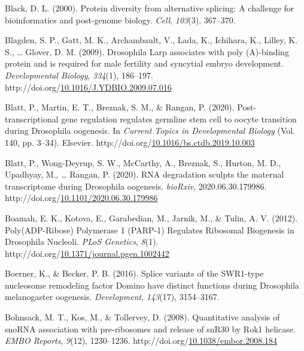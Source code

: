\documentclass[12pt,oneside]{reedthesis}
\newlength{\cslhangindent}
\newenvironment{CSLReferences}[2] %
 {%
  \setlength{\parindent}{0pt}
  \ifodd #1 \everypar{\setlength{\hangindent}{\cslhangindent}}\ignorespaces\fi
  \ifnum #2 > 0
  \setlength{\parskip}{#2\baselineskip}
  \fi
 }%
 {}
\begin{document}
\begin{CSLReferences}{1}{0}
\leavevmode{}%
Black, D. L. (2000). Protein diversity from alternative splicing: A challenge for bioinformatics and post-genome biology. \emph{Cell}, \emph{103}(3), 367--370.

\leavevmode{}%
Blagden, S. P., Gatt, M. K., Archambault, V., Lada, K., Ichihara, K., Lilley, K. S., \ldots{} Glover, D. M. (2009). Drosophila {Larp} associates with poly ({A})-binding protein and is required for male fertility and syncytial embryo development. \emph{Developmental Biology}, \emph{334}(1), 186--197. http://doi.org/\href{https://doi.org/10.1016/J.YDBIO.2009.07.016}{10.1016/J.YDBIO.2009.07.016}

\leavevmode{}%
Blatt, P., Martin, E. T., Breznak, S. M., \& Rangan, P. (2020). Post-transcriptional gene regulation regulates germline stem cell to oocyte transition during {Drosophila} oogenesis. In \emph{Current {Topics} in {Developmental Biology}} (Vol. 140, pp. 3--34). {Elsevier}. http://doi.org/\href{https://doi.org/10.1016/bs.ctdb.2019.10.003}{10.1016/bs.ctdb.2019.10.003}

\leavevmode{}%
Blatt, P., Wong-Deyrup, S. W., McCarthy, A., Breznak, S., Hurton, M. D., Upadhyay, M., \ldots{} Rangan, P. (2020). {RNA} degradation sculpts the maternal transcriptome during {Drosophila} oogenesis. \emph{bioRxiv}, 2020.06.30.179986. http://doi.org/\href{https://doi.org/10.1101/2020.06.30.179986}{10.1101/2020.06.30.179986}

\leavevmode{}%
Boamah, E. K., Kotova, E., Garabedian, M., Jarnik, M., \& Tulin, A. V. (2012). Poly({ADP-Ribose}) {Polymerase} 1 ({PARP-1}) {Regulates Ribosomal Biogenesis} in {Drosophila Nucleoli}. \emph{PLoS Genetics}, \emph{8}(1). http://doi.org/\href{https://doi.org/10.1371/journal.pgen.1002442}{10.1371/journal.pgen.1002442}

\leavevmode{}%
Boerner, K., \& Becker, P. B. (2016). Splice variants of the {SWR1-type} nucleosome remodeling factor {Domino} have distinct functions during {Drosophila} melanogaster oogenesis. \emph{Development}, \emph{143}(17), 3154--3167.

\leavevmode{}%
Bohnsack, M. T., Kos, M., \& Tollervey, D. (2008). Quantitative analysis of {snoRNA} association with pre-ribosomes and release of {snR30} by {Rok1} helicase. \emph{EMBO Reports}, \emph{9}(12), 1230--1236. http://doi.org/\href{https://doi.org/10.1038/embor.2008.184}{10.1038/embor.2008.184}


\end{CSLReferences}
\end{document}
